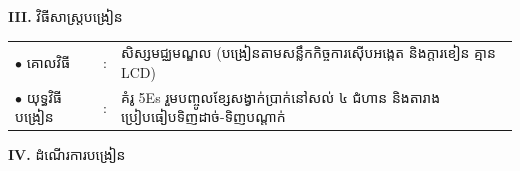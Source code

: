 \documentclass[a4paper,10pt]{article}
\newcommand{\en}[1]{{\TimesEn #1}}
\begin{document}
{\vspace{2pt}

\textbf{III.} {\muol វិធីសាស្រ្តបង្រៀន}\\[1pt]
\hspace*{0.45cm}%
\begin{tabular}{@{}l l L{14.85cm}@{}}
  $\bullet$ \hspace{0.25cm} គោលវិធី & : & សិស្សមជ្ឈមណ្ឌល (បង្រៀនតាមសន្លឹកកិច្ចការស៊ើបអង្កេត និងក្ដារខៀន គ្មាន \en{LCD}) \\
  $\bullet$ \hspace{0.25cm} យុទ្ធវិធីបង្រៀន & : & គំរូ \en{5Es} រួមបញ្ចូលខ្សែសង្វាក់ប្រាក់នៅសល់ ៤ ជំហាន និងតារាងប្រៀបធៀបទិញដាច់-ទិញបណ្ដាក់ \\
\end{tabular}
}

\vspace{2pt}

\textbf{IV.} {\muol ដំណើរការបង្រៀន}

\vspace{1pt}
\end{document}

